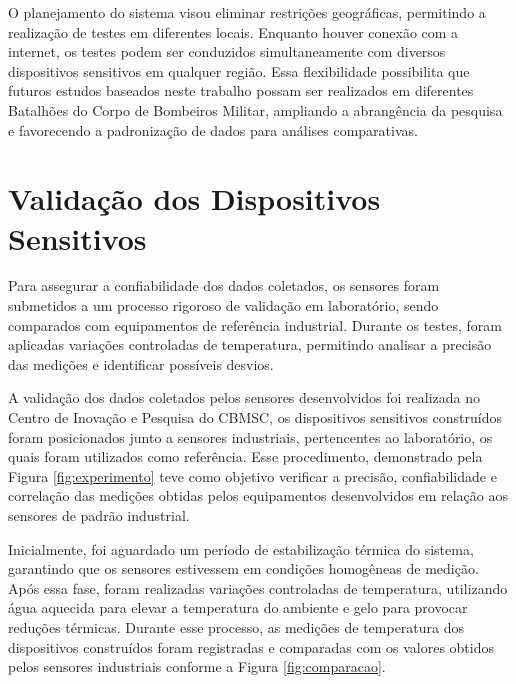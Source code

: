 
\tab O planejamento do sistema visou eliminar restrições geográficas, permitindo a realização de testes em diferentes locais. Enquanto houver conexão com a internet, os testes podem ser conduzidos simultaneamente com diversos dispositivos sensitivos em qualquer região. Essa flexibilidade possibilita que futuros estudos baseados neste trabalho possam ser realizados em diferentes Batalhões do Corpo de Bombeiros Militar, ampliando a abrangência da pesquisa e favorecendo a padronização de dados para análises comparativas.

	
	
\section{Validação dos Dispositivos Sensitivos}
    Para assegurar a confiabilidade dos dados coletados, os sensores foram submetidos a um processo 
	rigoroso de validação em laboratório, sendo comparados com equipamentos de referência industrial. 
	Durante os testes, foram aplicadas variações controladas de temperatura, permitindo analisar a 
	precisão das medições e identificar possíveis desvios.

	A validação dos dados coletados pelos sensores desenvolvidos foi realizada no Centro de Inovação 
	e Pesquisa do \acrshort{CBMSC}, os dispositivos sensitivos
	 construídos foram posicionados junto a sensores industriais, pertencentes ao laboratório, os 
	 quais foram utilizados como referência. Esse procedimento, demonstrado pela Figura 
	 \ref{fig:experimento} teve como objetivo verificar a precisão, confiabilidade e correlação das 
	 medições obtidas pelos equipamentos desenvolvidos em relação aos sensores de padrão industrial.
	
	
	Inicialmente, foi aguardado um período de estabilização térmica do sistema, garantindo que 
	os sensores estivessem em condições homogêneas de medição. Após essa fase, foram 
	realizadas variações controladas de temperatura, utilizando água aquecida para elevar a 
	temperatura do ambiente e gelo para provocar reduções térmicas. Durante esse processo, as 
	medições de temperatura dos dispositivos construídos foram registradas e comparadas com 
	os valores obtidos pelos sensores industriais conforme a Figura \ref{fig:comparacao}.
	
